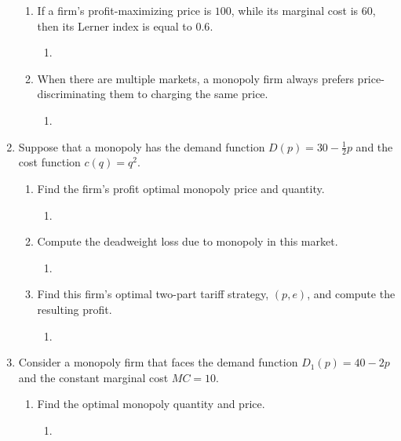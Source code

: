 \documentclass[11pt]{article}
\begin{document}
\begin{enumerate}
\begin{enumerate}
	\item If a firm's profit-maximizing price is $100$, while its marginal cost is $60$, then its Lerner index is equal to $0.6$.
	\begin{enumerate}
        \item 
    \end{enumerate}
	

    \item When there are multiple markets, a monopoly firm always prefers price-discriminating them to charging the same price.
    \begin{enumerate}
        \item 
    \end{enumerate}
	

    \end{enumerate}

\pagebreak
\item Suppose that a monopoly has the demand function $D(p)=30-\frac{1}{2}p$ and the cost function $c(q)=q^{2}$.
	\begin{enumerate}
    \item Find the firm's profit optimal monopoly price and quantity.
    \begin{enumerate}
        \item 
    \end{enumerate}
	
	
    \item Compute the deadweight loss due to monopoly in this market.
    \begin{enumerate}
        \item 
    \end{enumerate}
	
	
	\item Find this firm's optimal two-part tariff strategy, $(p,e)$, and compute the resulting profit.
	\begin{enumerate}
        \item 
    \end{enumerate}
	
	
	\end{enumerate}

\pagebreak
\item Consider a monopoly firm that faces the demand function $D_{1}(p)=40-2p$ and the constant marginal cost $MC=10$.
    \begin{enumerate}
    \item Find the optimal monopoly quantity and price.
    \begin{enumerate}
        \item 
    \end{enumerate}
	


\end{enumerate}
\end{enumerate}
\end{document}
